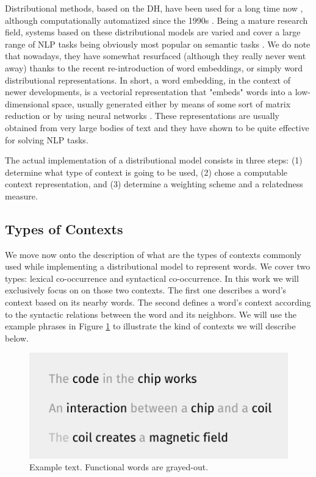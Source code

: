 Distributional methods, based on the DH, have been used for a long time now \cite{JurafskyM09}, although computationally automatized since the 1990s \cite{perinet2015}. Being a mature research field, systems based on these distributional models are varied and cover a large range of NLP tasks being obviously most popular on semantic tasks \cite{bruni2014multimodal}. We do note that nowadays, they have somewhat resurfaced (although they really never went away) thanks to the recent re-introduction of word embeddings, or simply word distributional representations. In short, a word embedding, in the context of newer developments, is a vectorial representation  that "embeds" words into a low-dimensional space, usually generated either by means of some sort of matrix reduction \cite{lebret2013deep,levy2014neural} or by using neural networks \cite{Collobert2011,mikolov2013distributed}. These representations are usually obtained from very large bodies of text and they have shown to be quite effective for solving NLP tasks.

The actual implementation of a distributional model consists in three steps: (1) determine what type of context is going to be used, (2) chose a computable context representation, and (3) determine a weighting scheme  and a  relatedness measure.

\subsection{Types of Contexts}\label{sec:contexts}
We move now onto the description of what are the types of contexts commonly used while implementing a distributional model to represent words.  We cover two types: lexical co-occurrence and syntactical co-occurrence. In this work we will exclusively focus on on those two contexts. The first one describes a word's context based on its nearby words.  The second defines a word's context according to the syntactic relations between the word and its neighbors. We will use the example phrases in Figure \ref{fig:example_phrases} to illustrate the kind of contexts we will describe below. 
\begin{figure}
\centering
\includegraphics[width=0.7\linewidth]{images/Chapitre2/example_phrases.pdf}
\caption{Example text. Functional words are grayed-out. }
\label{fig:example_phrases}
\end{figure}

